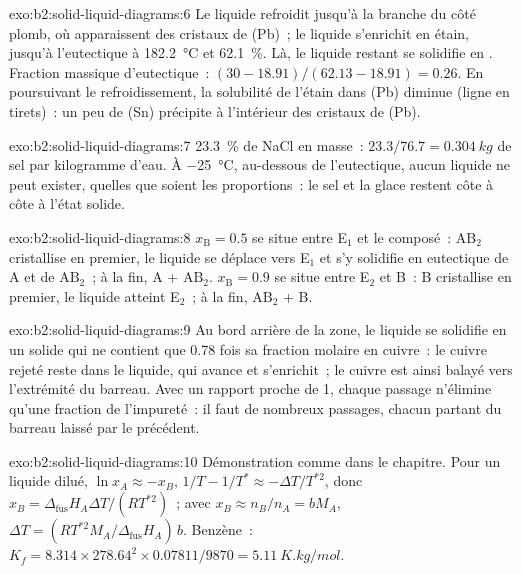 \begin{solution}{exo:b2:solid-liquid-diagrams:6}
Le liquide refroidit jusqu'à la branche du  côté plomb, où apparaissent des cristaux de (Pb)~; le
liquide s'enrichit en étain, jusqu'à l'eutectique à \qty{182.2}{\degreeCelsius}
et 62.1~\%. Là, le liquide restant se solidifie en .
Fraction massique d'eutectique~: $(30 - 18.91)/(62.13 - 18.91) = 0.26$. En poursuivant
le refroidissement, la solubilité de l'étain dans (Pb) diminue (ligne en tirets)~: un peu de (Sn)
précipite à l'intérieur des cristaux de (Pb).
\end{solution}

\begin{solution}{exo:b2:solid-liquid-diagrams:7}
23.3~\% de NaCl en masse~: $23.3/76.7 = \qty{0.304}{kg}$ de sel par kilogramme
d'eau. À \qty{-25}{\degreeCelsius}, au-dessous de l'eutectique, aucun liquide ne peut exister,
quelles que soient les proportions~: le sel et la glace restent côte à côte à l'état solide.
\end{solution}

\begin{solution}{exo:b2:solid-liquid-diagrams:8}
$x_{\mathrm B} = 0.5$ se situe entre E$_1$ et le composé~: $\mathrm{AB_2}$
cristallise en premier, le liquide se déplace vers E$_1$ et s'y solidifie en
eutectique de A et de $\mathrm{AB_2}$~; à la fin, A + $\mathrm{AB_2}$.
$x_{\mathrm B} = 0.9$ se situe entre E$_2$ et B~: B cristallise en premier, le liquide
atteint E$_2$~; à la fin, $\mathrm{AB_2}$ + B.
\end{solution}

\begin{solution}{exo:b2:solid-liquid-diagrams:9}
Au bord arrière de la zone, le liquide se solidifie en un solide qui ne contient que 0.78
fois sa fraction molaire en cuivre~: le cuivre rejeté reste dans le liquide, qui
avance et s'enrichit~; le cuivre est ainsi balayé vers l'extrémité du barreau.
Avec un rapport proche de 1, chaque passage n'élimine qu'une fraction de l'impureté~:
il faut de nombreux passages, chacun partant du barreau laissé par le précédent.
\end{solution}

\begin{solution}{exo:b2:solid-liquid-diagrams:10}
Démonstration comme dans le chapitre. Pour un liquide dilué, $\ln x_A \approx -x_B$, $1/T -
1/T^* \approx -\Delta T/T^{*2}$, donc $x_B = \Delta_{\text{fus}}H_A\Delta T/(RT^{*2})$~;
avec $x_B \approx n_B/n_A = bM_A$, $\Delta T = (RT^{*2}M_A/\Delta_{\text{fus}}H_A)\,b$.
Benzène~: $K_f = 8.314 \times 278.64^2 \times 0.07811/9870 = \qty{5.11}{K.kg/mol}$.
\end{solution}

